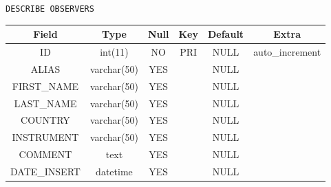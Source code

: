 \documentclass[12pt]{article}
\begin{document}
{\centering
    \caption{\texttt{DESCRIBE OBSERVERS}}
    \begin{tabular}{c|c|c|c|c|c}%
        \textbf{Field} & \textbf{Type} & \textbf{Null} & \textbf{Key} & \textbf{Default} & \textbf{Extra}  \\
        \hline
        ID & int(11) & NO & PRI & NULL & auto\_increment \\
        
        ALIAS & varchar(50) & YES && NULL & \\
        
        FIRST\_NAME & varchar(50) & YES && NULL &  \\
        
        LAST\_NAME & varchar(50) & YES && NULL &  \\
        
        COUNTRY & varchar(50) & YES && NULL &  \\
        
        INSTRUMENT & varchar(50) & YES && NULL & \\
        
        COMMENT & text & YES && NULL &  \\
        
        DATE\_INSERT & datetime & YES && NULL &  \\
        
    \end{tabular}
    \label{tab:data-og}
\par}\\
\end{document}
